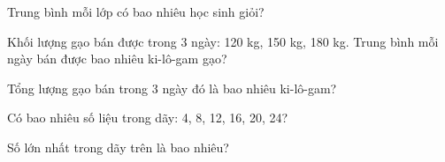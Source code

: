 \begin{ex}
Trung bình mỗi lớp có bao nhiêu học sinh giỏi?
\end{ex}

\begin{ex}
Khối lượng gạo bán được trong 3 ngày: 120 kg, 150 kg, 180 kg. Trung bình mỗi ngày bán được bao nhiêu ki-lô-gam gạo?
\end{ex}

\begin{ex}
Tổng lượng gạo bán trong 3 ngày đó là bao nhiêu ki-lô-gam?
\end{ex}

\begin{ex}
Có bao nhiêu số liệu trong dãy: 4, 8, 12, 16, 20, 24?
\end{ex}

\begin{ex}
Số lớn nhất trong dãy trên là bao nhiêu?
\end{ex}

